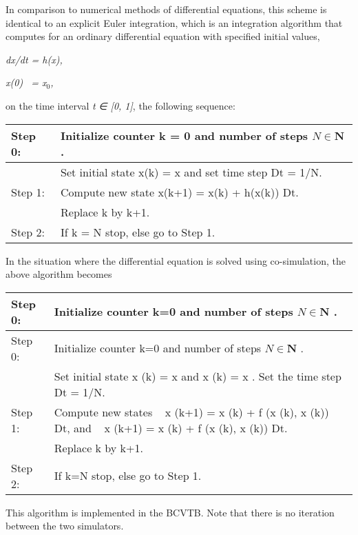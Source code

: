 In comparison to numerical methods of differential equations, this scheme is identical to an explicit Euler integration, which is an integration algorithm that computes for an ordinary differential equation with specified initial values,

\emph{dx/dt = h(x),}

\emph{x(0)~ = x\(_{0}\),}

on the time interval \emph{t} \emph{∈ {[}0, 1{]}}, the following sequence:

\begin{longtable}[c]{p{1.5in}p{4.5in}}
\toprule 
Step 0: & Initialize counter k = 0 and number of steps $N \in \mathbf{N}$ . \tabularnewline \midrule
\endhead
~ & Set initial state x(k) = x   and set time step Dt = 1/N. \tabularnewline
Step 1: & Compute new state x(k+1) = x(k) + h(x(k)) Dt. \tabularnewline
~ & Replace k by k+1. \tabularnewline
Step 2: & If k = N stop, else go to Step 1. \tabularnewline
\bottomrule
\end{longtable}

In the situation where the differential equation is solved using co-simulation, the above algorithm becomes

\begin{longtable}[c]{p{1.5in}p{4.5in}}
\toprule 
Step 0: & Initialize counter k=0 and number of steps $N \in \mathbf{N}$ . \tabularnewline
\midrule
\endfirsthead

\toprule 
Step 0: & Initialize counter k=0 and number of steps $N \in \mathbf{N}$ . \tabularnewline
\midrule
\endhead

~ & Set initial state x  (k) = x   and x  (k) = x  . Set the time step Dt = 1/N. \tabularnewline
Step 1: & Compute new states ~ x  (k+1) = x  (k) + f  (x  (k), x  (k)) Dt, and ~ x  (k+1) = x  (k) + f  (x  (k), x  (k)) Dt. \tabularnewline
~ & Replace k by k+1. \tabularnewline
Step 2: & If k=N stop, else go to Step 1. \tabularnewline
\bottomrule
\end{longtable}

This algorithm is implemented in the BCVTB. Note that there is no iteration between the two simulators.
